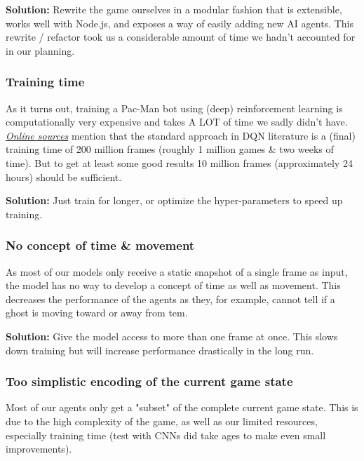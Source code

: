 \documentclass[10pt, letterpaper]{article}
\begin{document}
            \vspace{1em}\noindent
            \textbf{Solution:} Rewrite the game ourselves in a modular fashion that is extensible, works well with Node.js, and exposes a way of easily adding new AI agents. This rewrite / refactor took us a considerable amount of time we hadn't accounted for in our planning.
            
        \subsubsection*{Training time}
            As it turns out, training a Pac-Man bot using (deep) reinforcement learning is computationally very expensive and takes A LOT of time we sadly didn't have. \emph{\href{https://towardsdatascience.com/advanced-dqns-playing-pac-man-with-deep-reinforcement-learning-3ffbd99e0814}{Online sources}} mention that the standard approach in DQN literature is a (final) training time of 200 million frames (roughly 1 million games \& two weeks of time). But to get at least some good results 10 million frames (approximately 24 hours) should be sufficient.
            
            \vspace{1em}\noindent
            \textbf{Solution:} Just train for longer, or optimize the hyper-parameters to speed up training.
        
        \subsubsection*{No concept of time \& movement}
            As most of our models only receive a static snapshot of a single frame as input, the model has no way to develop a concept of time as well as movement. This decreases the performance of the agents as they, for example, cannot tell if a ghost is moving toward or away from tem.
            
            \vspace{1em}\noindent
            \textbf{Solution:} Give the model access to more than one frame at once. This slows down training but will increase performance drastically in the long run.
        
        \subsubsection*{Too simplistic encoding of the current game state}
            Most of our agents only get a "subset" of the complete current game state. This is due to the high complexity of the game, as well as our limited resources, especially training time (test with CNNs did take ages to make even small improvements).
            
\end{document}

